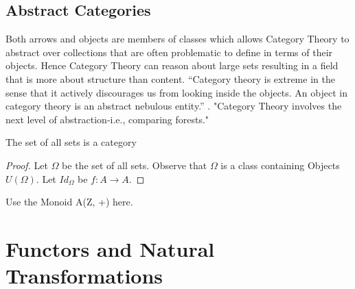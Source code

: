 \documentclass{article}
\begin{document}
\subsection{Abstract Categories}
Both arrows and objects are members of classes which allows Category Theory to abstract over collections that are often problematic to define in terms of their objects. Hence Category Theory can reason about large sets resulting in a field that is more about structure than content. “Category theory is extreme in the sense that it actively discourages us from looking inside the objects. An object in category theory is an abstract nebulous entity.” \cite{Milewski01}. "Category Theory involves the next level of abstraction-i.e., comparing forests." \cite{Herrlich01}

\begin{theorem}
  The set of all sets is a category
\end{theorem}

\begin{proof}
Let $\Omega$ be the set of all sets. Observe that $\Omega$ is a class containing Objects $U(\Omega)$. Let $Id_{\Omega}$ be $f: A \to A$.
\end{proof}

\begin{example}
Use the Monoid A(Z, +) here.
\end{example}



\section{Functors and Natural Transformations}



\end{document}
